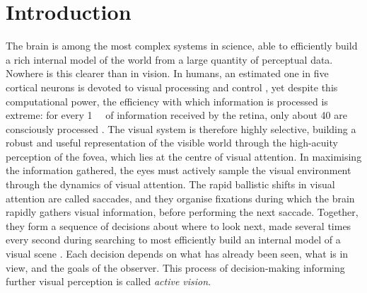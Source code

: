 \chapter*{Introduction}

The brain is among the most complex systems in science, able to efficiently build a rich internal model of the world from a large quantity of perceptual data. Nowhere is this clearer than in vision. In humans, an estimated one in five cortical neurons is devoted to visual processing and control \cite{wandell_visual_2009, andrews_correlated_1997}, yet despite this computational power, the efficiency with which information is processed is extreme: for every \qty{1}{\mega\byte} of information received by the retina, only about \qty{40}{\bit} are consciously processed \cite{ZHAOPING2026103211, kelly1962information, sziklai1956some}. The visual system is therefore highly selective, building a robust and useful representation of the visible world through the high-acuity perception of the fovea, which lies at the centre of visual attention. In maximising the information gathered, the eyes must actively sample the visual environment through the dynamics of visual attention. The rapid ballistic shifts in visual attention are called saccades, and they organise fixations during which the brain rapidly gathers visual information, before performing the next saccade. Together, they form a sequence of decisions about where to look next, made several times every second during searching to most efficiently build an internal model of a visual scene \cite{erkelens_coordination_2006, engbert_integrated_2011}. Each decision depends on what has already been seen, what is in view, and the goals of the observer. This process of decision-making informing further visual perception is called \textit{active vision}.

